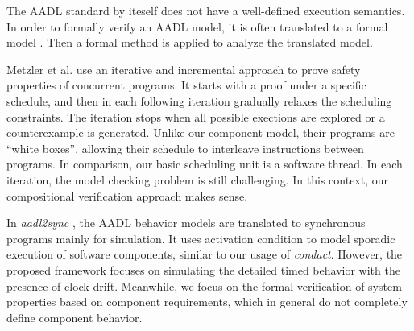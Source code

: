 The AADL standard by iteself does not have a well-defined execution semantics. In order to formally verify an AADL model, it is often translated to a formal model \cite{AADL2TASM} \cite{AADL2Sync} \cite{AADL2TLA} \cite{AADS} \cite{AADL2BIP}. Then a formal method is applied to analyze the translated model.

Metzler et al. \cite{Metzler2020} use an iterative and incremental approach to prove safety properties of concurrent programs. It starts with a proof under a specific schedule, and then in each following iteration gradually relaxes the scheduling constraints. The iteration stops when all possible exections are explored or a counterexample is generated. Unlike our component model, their programs are ``white boxes'', allowing their schedule to interleave instructions between programs. In comparison, our basic scheduling unit is a software thread. In each iteration, the model checking problem is still challenging. In this context, our compositional verification approach makes sense.

In \emph{aadl2sync} \cite{AADL2Sync}, the AADL behavior models are translated to synchronous programs mainly for simulation. It uses activation condition to model sporadic execution of software components, similar to our usage of \emph{condact}. However, the proposed framework focuses on simulating the detailed timed behavior with the presence of clock drift. Meanwhile, we focus on the formal verification of system properties based on component requirements, which in general do not completely define component behavior.

